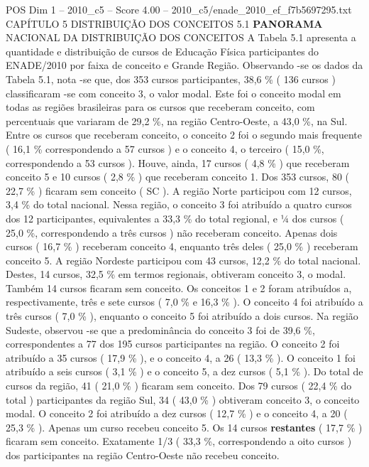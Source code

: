 \begin{textsample}{POS Dim 1 – 2010\_c5 – Score 4.00 – 2010\_c5/enade\_2010\_ef\_f7b5697295.txt}  \label{ex:f1_pos_131}
CAPÍTULO 5 DISTRIBUIÇÃO DOS CONCEITOS 5.1 \textbf{PANORAMA} NACIONAL DA DISTRIBUIÇÃO DOS CONCEITOS A Tabela 5.1 apresenta a quantidade e distribuição de cursos de Educação Física participantes do ENADE/2010 por faixa de conceito e Grande Região.
Observando -se os dados da Tabela 5.1, nota -se que, dos 353 cursos participantes, 38,6 \% ( 136 cursos ) classificaram -se com conceito 3, o valor modal.
Este foi o conceito modal em todas as regiões brasileiras para os cursos que receberam conceito, com percentuais que variaram de 29,2 \%, na região Centro-Oeste, a 43,0 \%, na Sul.
Entre os cursos que receberam conceito, o conceito 2 foi o segundo mais frequente ( 16,1 \% correspondendo a 57 cursos ) e o conceito 4, o terceiro ( 15,0 \%, correspondendo a 53 cursos ).
Houve, ainda, 17 cursos ( 4,8 \% ) que receberam conceito 5 e 10 cursos ( 2,8 \% ) que receberam conceito 1.
Dos 353 cursos, 80 ( 22,7 \% ) ficaram sem conceito ( SC ).
A região Norte participou com 12 cursos, 3,4 \% do total nacional.
Nessa região, o conceito 3 foi atribuído a quatro cursos dos 12 participantes, equivalentes a 33,3 \% do total regional, e ¼ dos cursos ( 25,0 \%, correspondendo a três cursos ) não receberam conceito.
Apenas dois cursos ( 16,7 \% ) receberam conceito 4, enquanto três deles ( 25,0 \% ) receberam conceito 5.
A região Nordeste participou com 43 cursos, 12,2 \% do total nacional.
Destes, 14 cursos, 32,5 \% em termos regionais, obtiveram conceito 3, o modal.
Também 14 cursos ficaram sem conceito.
Os conceitos 1 e 2 foram atribuídos a, respectivamente, três e sete cursos ( 7,0 \% e 16,3 \% ).
O conceito 4 foi atribuído a três cursos ( 7,0 \% ), enquanto o conceito 5 foi atribuído a dois cursos.
Na região Sudeste, observou -se que a predominância do conceito 3 foi de 39,6 \%, correspondentes a 77 dos 195 cursos participantes na região.
O conceito 2 foi atribuído a 35 cursos ( 17,9 \% ), e o conceito 4, a 26 ( 13,3 \% ).
O conceito 1 foi atribuído a seis cursos ( 3,1 \% ) e o conceito 5, a dez cursos ( 5,1 \% ).
Do total de cursos da região, 41 ( 21,0 \% ) ficaram sem conceito.
Dos 79 cursos ( 22,4 \% do total ) participantes da região Sul, 34 ( 43,0 \% ) obtiveram conceito 3, o conceito modal.
O conceito 2 foi atribuído a dez cursos ( 12,7 \% ) e o conceito 4, a 20 ( 25,3 \% ).
Apenas um curso recebeu conceito 5.
Os 14 cursos \textbf{restantes} ( 17,7 \% ) ficaram sem conceito.
Exatamente 1/3 ( 33,3 \%, correspondendo a oito cursos ) dos participantes na região Centro-Oeste não recebeu conceito.

\end{textsample}
